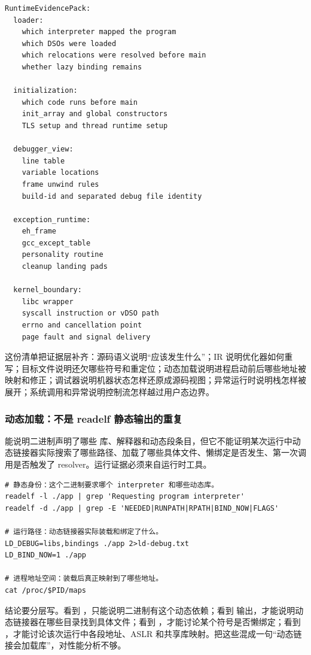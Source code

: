 \begin{lstlisting}[numbers=none,caption={RuntimeEvidencePack 的问题边界}]
RuntimeEvidencePack:
  loader:
    which interpreter mapped the program
    which DSOs were loaded
    which relocations were resolved before main
    whether lazy binding remains

  initialization:
    which code runs before main
    init_array and global constructors
    TLS setup and thread runtime setup

  debugger_view:
    line table
    variable locations
    frame unwind rules
    build-id and separated debug file identity

  exception_runtime:
    eh_frame
    gcc_except_table
    personality routine
    cleanup landing pads

  kernel_boundary:
    libc wrapper
    syscall instruction or vDSO path
    errno and cancellation point
    page fault and signal delivery
\end{lstlisting}

这份清单把证据层补齐：源码语义说明“应该发生什么”；IR 说明优化器如何重写；目标文件说明还欠哪些符号和重定位；动态加载说明进程启动前后哪些地址被映射和修正；调试器说明机器状态怎样还原成源码视图；异常运行时说明栈怎样被展开；系统调用和异常说明控制流怎样越过用户态边界。

\subsubsection{动态加载：不是 readelf 静态输出的重复}

 能说明二进制声明了哪些  库、解释器和动态段条目，但它不能证明某次运行中动态链接器实际搜索了哪些路径、加载了哪些具体文件、懒绑定是否发生、第一次调用是否触发了 resolver。运行证据必须来自运行时工具。

\begin{lstlisting}[numbers=none,caption={动态加载运行证据}]
# 静态身份：这个二进制要求哪个 interpreter 和哪些动态库。
readelf -l ./app | grep 'Requesting program interpreter'
readelf -d ./app | grep -E 'NEEDED|RUNPATH|RPATH|BIND_NOW|FLAGS'

# 运行路径：动态链接器实际装载和绑定了什么。
LD_DEBUG=libs,bindings ./app 2>ld-debug.txt
LD_BIND_NOW=1 ./app

# 进程地址空间：装载后真正映射到了哪些地址。
cat /proc/$PID/maps
\end{lstlisting}

结论要分层写。看到 ，只能说明二进制有这个动态依赖；看到  输出，才能说明动态链接器在哪些目录找到具体文件；看到 ，才能讨论某个符号是否懒绑定；看到 ，才能讨论该次运行中各段地址、ASLR 和共享库映射。把这些混成一句“动态链接会加载库”，对性能分析不够。

